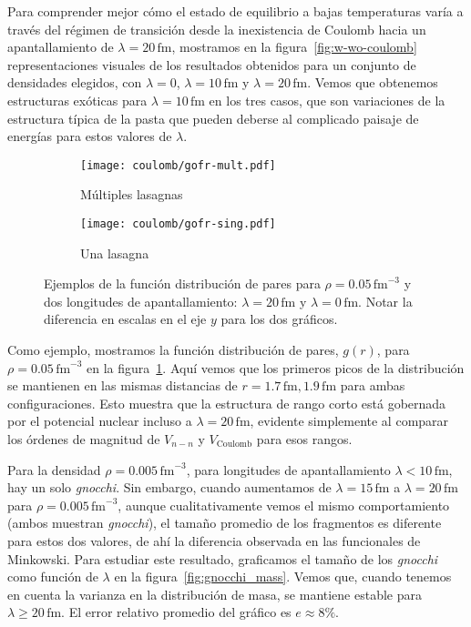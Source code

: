 Para comprender mejor cómo el estado de equilibrio a bajas temperaturas varía a través del régimen de transición desde la inexistencia de Coulomb hacia un apantallamiento de $\lambda=20\,\text{fm}$, mostramos en la figura~\ref{fig:w-wo-coulomb} representaciones visuales de los resultados obtenidos para un conjunto de densidades elegidos, con $\lambda=0$, $\lambda=10\,\text{fm}$ y $\lambda=20\,\text{fm}$.
Vemos que obtenemos estructuras exóticas para $\lambda=10\,\text{fm}$ en los tres casos, que son variaciones de la estructura típica de la pasta que pueden deberse al complicado paisaje de energías para estos valores de $\lambda$.

\begin{figure}[h!]  %
\centering
\begin{subfigure}[h!]{0.48\columnwidth}
  \centering
  \texttt{[image: coulomb/gofr-mult.pdf]}
  \caption{Múltiples lasagnas}
\end{subfigure}
\begin{subfigure}[h!]{0.48\columnwidth}
  \centering
  \texttt{[image: coulomb/gofr-sing.pdf]}
  \caption{Una lasagna}
\end{subfigure}
\caption{Ejemplos de la función distribución de pares para $\rho=0.05\,\text{fm}^{-3}$ y dos longitudes de apantallamiento:
  $\lambda=20\,\text{fm}$ y $\lambda=0\,\text{fm}$.
  Notar la diferencia en escalas en el eje $y$ para los dos gráficos.}
\label{fig:gofr}
\end{figure}

Como ejemplo, mostramos la función distribución de pares, $g(r)$, para $\rho=0.05\,\text{fm}^{-3}$ en la figura~\ref{fig:gofr}.
Aquí vemos que los primeros picos de la distribución se mantienen en las mismas distancias de $r=1.7\,\text{fm}, 1.9\,\text{fm}$ para ambas configuraciones.
Esto muestra que la estructura de rango corto está gobernada por el potencial nuclear incluso a $\lambda=20\,\text{fm}$, evidente simplemente al comparar los órdenes de magnitud de $V_{n-n}$ y $V_{\text{Coulomb}}$ para esos rangos.

Para la densidad $\rho=0.005\,\text{fm}^{-3}$, para longitudes de apantallamiento $\lambda<10\,\text{fm}$, hay un solo \emph{gnocchi}.
Sin embargo, cuando aumentamos de $\lambda=15\,\text{fm}$ a $\lambda=20\,\text{fm}$ para $\rho=0.005\,\text{fm}^{-3}$, aunque cualitativamente vemos el mismo comportamiento (ambos muestran \emph{gnocchi}), el tamaño promedio de los fragmentos es diferente para estos dos valores, de ahí la diferencia observada en las funcionales de Minkowski.
Para estudiar este resultado, graficamos el tamaño de los \emph{gnocchi} como función de $\lambda$ en la figura~\ref{fig:gnocchi_mass}.
Vemos que, cuando tenemos en cuenta la varianza en la distribución de masa, se mantiene estable para $\lambda\geq20\,\text{fm}$.
El error relativo promedio del gráfico es $e\approx8\%$.

